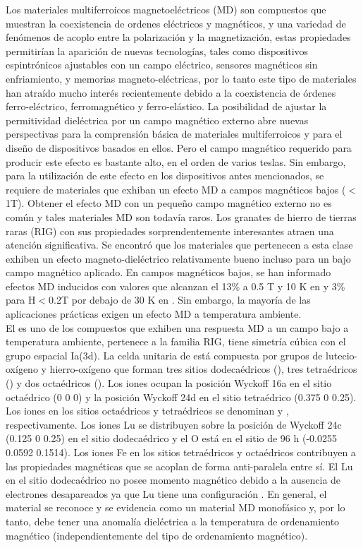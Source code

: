 Los materiales multiferroicos magnetoeléctricos (MD) son compuestos que
muestran la coexistencia de ordenes eléctricos y magnéticos, y una variedad de
fenómenos de acoplo entre la polarización y la magnetización, estas propiedades
permitirían la aparición de nuevas tecnologías, tales como dispositivos
espintrónicos ajustables con un campo eléctrico, sensores magnéticos sin
enfriamiento, y memorias magneto-eléctricas, por lo tanto este tipo de
materiales han atraído mucho interés recientemente debido a la coexistencia de
órdenes ferro-eléctrico, ferromagnético y ferro-elástico. La posibilidad de
ajustar la permitividad dieléctrica por un campo magnético externo abre nuevas
perspectivas para la comprensión básica de materiales multiferroicos y para el
diseño de dispositivos basados en ellos. Pero el campo magnético requerido para
producir este efecto es bastante alto, en el orden de varios teslas. Sin
embargo, para la utilización de este efecto en los dispositivos antes
mencionados, se requiere de materiales que exhiban un efecto MD a campos
magnéticos bajos ($<$1T). Obtener el efecto MD con un pequeño campo magnético
externo no es común y tales materiales MD son todavía raros. Los granates de
hierro de tierras raras (RIG) con sus propiedades sorprendentemente
interesantes atraen una atención significativa. Se encontró que los materiales
que pertenecen a esta clase exhiben un efecto magneto-dieléctrico relativamente
bueno incluso para un bajo campo magnético aplicado. En campos magnéticos
bajos, se han informado efectos MD inducidos con valores que alcanzan el 13\% a
0.5 T y 10 K en  y 3\% para H$<$0.2T por debajo de 30 K en
\cite{Manimuthu2015}. Sin embargo, la mayoría de las aplicaciones
prácticas exigen un efecto MD a temperatura ambiente.\\

El  es uno de los compuestos que exhiben una respuesta MD a un
campo bajo a temperatura ambiente, pertenece a la familia RIG, tiene simetría
cúbica con el grupo espacial Ia(3d). La celda unitaria de  está
compuesta por grupos de lutecio-oxígeno y hierro-oxígeno que forman tres sitios
dodecaédricos (), tres tetraédricos () y dos octaédricos
(). Los iones  ocupan la posición Wyckoff 16a en el sitio
octaédrico (0 0 0) y la posición Wyckoff 24d en el sitio tetraédrico (0.375 0
0.25). Los iones  en los sitios octaédricos y tetraédricos se
denominan  y , respectivamente. Los iones Lu se
distribuyen sobre la posición de Wyckoff 24c (0.125 0 0.25) en el sitio
dodecaédrico y el O está en el sitio de 96 h (-0.0255 0.0592 0.1514). Los iones
Fe en los sitios tetraédricos y octaédricos contribuyen a las propiedades
magnéticas que se acoplan de forma anti-paralela entre sí. El Lu en el sitio
dodecaédrico no posee momento magnético debido a la ausencia de electrones
desapareados ya que Lu tiene una configuración . En general, el
material se reconoce y se evidencia como un material MD monofásico y, por lo
tanto, debe tener una anomalía dieléctrica a la temperatura de ordenamiento
magnético (independientemente del tipo de ordenamiento
magnético)\cite{Manimuthu2014}.

